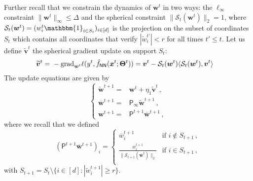\documentclass[11pt]{article}
\newcommand{\<}{\langle}
\renewcommand{\>}{\rangle}
\theoremstyle{definition}
\def\bv{{\boldsymbol v}}
\def\bw{{\boldsymbol w}}
\def\bx{{\boldsymbol x}}
\def\bTheta{{\boldsymbol \Theta}}
\def\hf{{\hat f}}
\def\cS{{\mathcal S}}
\def\proj{{\mathsf P}}
\def\NN{{\sf NN}}
\def\proj{{\mathsf P}}
\def\proj{{\mathsf P}}
\def\NN{{\sf NN}}
\def\proj{{\mathsf P}}
\def\proj{{\mathsf P}}
\def\bv{{\boldsymbol v}}
\def\bTheta{{\boldsymbol \Theta}}
\def\NN{{\sf NN}}
\def\bw{{\boldsymbol w}}
\def\bx{{\boldsymbol x}}
\def\proj{{\mathsf P}}
\def\cS{{\mathcal S}}
\def\bTheta{{\boldsymbol \Theta}}
\def\hf{\hat f}
\def\ind{\mathbbm{1}}
\def\tbw{\widetilde \bw}
\def\grad{\text{grad}}
\def\obw{\overline{\bw}}
\def\tbw{\widetilde{\bw}}
\def\tbv{\widetilde{\bv}}
\def\tw{\widetilde{w}}
\def\ow{\overline{w}}
\newcommand{\fNN}{\hf_{\NN}}
\begin{document}
 Further recall that we constrain the dynamics of $\bw^t$ in two ways: the $\ell_\infty$ constraint $\| \bw^t \|_\infty \leq \Delta$ and the spherical constraint $\| \cS_t ( \bw^t ) \|_2 = 1$, where $\cS_t (\bw^t) = ( w_i^t \ind_{i \in S_t})_{i \in [d]}$ is the projection on the subset of coordinates $S_t$ which contains all coordinates that verify $|\tw^{t'}_i | < r$ for all times $t ' \leq t$. Let us define $\tbv^t$ the spherical gradient update on support $S_t$:
 \[
\begin{aligned}
\tbv^t = &~ - \grad_{\bw^t} \ell(y^t,\fNN(\bx^t;\bTheta^t)) = \bv^t - \cS_t (\bw^t) \< \cS_t ( \bw^t) , \bv^t \>
\end{aligned}
\]
The update equations are given by
\[
\begin{cases}
\tbw^{t+1} =& \bw^t + \eta_1 \tbv^t \, ,\\
\obw^{t+1} = & \proj_\infty \tbw^{t+1}  \, , \\
\bw^{t+1} = & \proj^{t+1} \obw^{t+1} \, ,
\end{cases}
\]
where we recall that we defined
\[
(\proj^{t+1} \obw^{t+1})_i = \begin{cases}
    \ow_i^{t+1} & \text{if $i \not\in S_{t+1}$}\, , \\
    \frac{\ow_i^{t+1}}{\| \cS_{t+1} (\obw^t ) \|_2} &\text{if $i \in S_{t+1}$}\, , \\
\end{cases}
\]
with $S_{t+1} = S_t \setminus \{ i \in [d] : | \tw_i^{t+1} | \geq r\}$.
\end{document}
